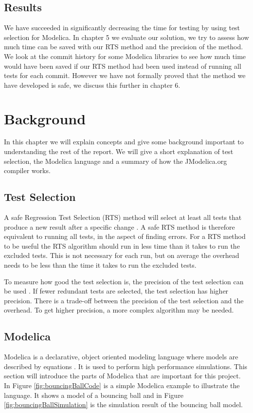 \documentclass{cslthse-msc}
\begin{document}
\section{Results}
We have succeeded in significantly decreasing the time for testing by using test selection for Modelica. In chapter 5 we evaluate our solution, we try to assess how much time can be saved with our RTS method and the precision of the method. We look at the commit history for some Modelica libraries to see how much time would have been saved if our RTS method had been used instead of running all tests for each commit. However we have not formally proved that the method we have developed is safe, we discuss this further in chapter 6.

\chapter[Background]{Background}
In this chapter we will explain concepts and give some background important to understanding the rest of the report. We will give a short explanation of test selection, the Modelica language and a summary of how the JModelica.org compiler works.

\section{Test Selection}
A safe Regression Test Selection (RTS) method will select at least all tests that produce a new result after a specific change \cite{DBLP:conf/pppj/OqvistHM16}. A safe RTS method is therefore equivalent to running all tests, in the aspect of finding errors. For a RTS method to be useful the RTS algorithm should run in less time than it takes to run the excluded tests. This is not necessary for each run, but on average the overhead needs to be less than the time it takes to run the excluded tests.

To measure how good the test selection is, the precision of the test selection can be used \cite{DBLP:conf/sigsoft/LegunsenHSLZM16}. If fewer redundant tests are selected, the test selection has higher precision. There is a trade-off between the precision of the test selection and the overhead. To get higher precision, a more complex algorithm may be needed.

\section{Modelica}
Modelica is a declarative, object oriented modeling language where models are described by equations \cite{modelicamodelica}. It is used to perform high performance simulations. This section will introduce the parts of Modelica that are important for this project. In Figure \ref{fig:bouncingBallCode} is a simple Modelica example to illustrate the language. It shows a model of a bouncing ball and in Figure \ref{fig:bouncingBallSimulation} is the simulation result of the bouncing ball model.
\end{document}
